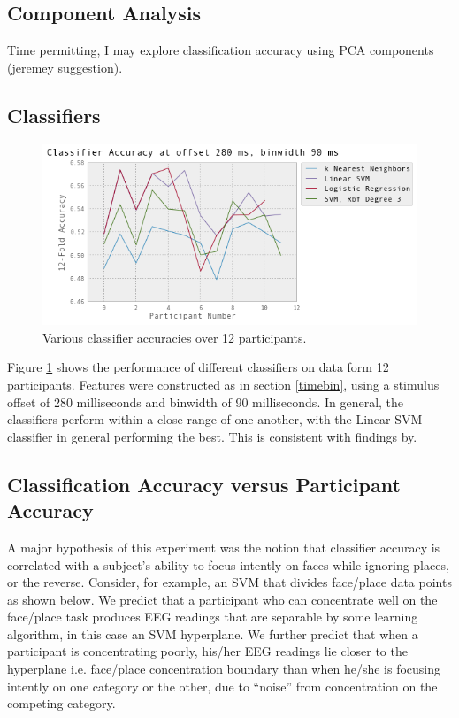 \documentclass[12pt]{report}
\begin{document}
\subsection{Component Analysis}

Time permitting, I may explore classification accuracy using PCA components (jeremey suggestion).

\subsection{Classifiers}

\begin{figure}[t]
\centerline{
\includegraphics[width=6in]{variousclassifiers}
}
\caption{Various classifier accuracies over 12 participants. \label{classifiers}}
\end{figure}

Figure \ref{classifiers} shows the performance of different classifiers on data form 12 participants.  Features were constructed as in section \ref{timebin}, using a stimulus offset of 280 milliseconds and binwidth of 90 milliseconds.  In general, the classifiers perform within a close range of one another, with the Linear SVM classifier in general performing the best.  This is consistent with findings by\cite{Lotte}.

\subsection{Classification Accuracy versus Participant Accuracy}

	A major hypothesis of this experiment was the notion that classifier accuracy is correlated with a subject's ability to focus intently on faces while ignoring places, or the reverse.  Consider, for example, an SVM that divides face/place data points as shown below.  We predict that a participant who can concentrate well on the face/place task produces EEG readings that are separable by some learning algorithm, in this case an SVM hyperplane.  We further predict that when a participant is concentrating poorly, his/her EEG readings lie closer to the hyperplane i.e. face/place concentration boundary than when he/she is focusing intently on one category or the other, due to ``noise'' from concentration on the competing category. 
\end{document}
